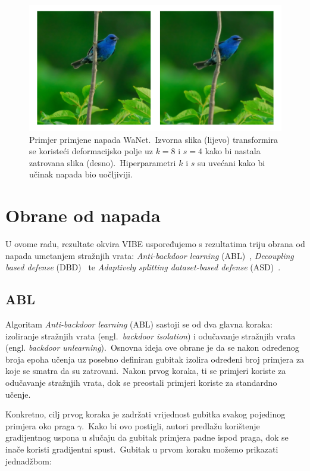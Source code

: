\documentclass[diplomskirad]{fer}
\begin{document}
\begin{figure}[h]
  \centering
  \includegraphics[scale=0.6]{./Slike/imagenet1k_uzorak_wanet.png}
  \caption{Primjer primjene napada WaNet.\ Izvorna slika (lijevo) transformira se koristeći deformacijsko polje uz $k = 8$ i $s = 4$ kako bi nastala zatrovana slika (desno).\ Hiperparametri $k$ i $s$ su uvećani kako bi učinak napada bio uočljiviji.}
  \label{fig:wanet}
\end{figure}

\section{Obrane od napada}
\label{sek:obrane}

U ovome radu, rezultate okvira VIBE uspoređujemo s rezultatima triju obrana od napada umetanjem stražnjih vrata: \textit{Anti-backdoor learning} (ABL)~\cite{li2021anti}, \textit{Decoupling based defense} (DBD)~\cite{huang2022backdoor} te \textit{Adaptively splitting dataset-based defense} (ASD)~\cite{gao2023backdoor}.\

\subsection{ABL}
\label{sub:abl}

Algoritam \textit{Anti-backdoor learning} (ABL) sastoji se od dva glavna koraka: izoliranje stražnjih vrata (engl.\ \textit{backdoor isolation}) i odučavanje stražnjih vrata (engl. \textit{backdoor unlearning}).\ 
Osnovna ideja ove obrane je da se nakon određenog broja epoha učenja uz posebno definiran gubitak izolira određeni broj primjera za koje se smatra da su zatrovani.\  
Nakon prvog koraka, ti se primjeri koriste za odučavanje stražnjih vrata, dok se preostali primjeri koriste za standardno učenje.\ 
  
Konkretno, cilj prvog koraka je zadržati vrijednost gubitka svakog pojedinog primjera oko praga $\gamma$.\
Kako bi ovo postigli, autori predlažu korištenje gradijentnog uspona u slučaju da gubitak primjera padne ispod praga, dok se inače koristi gradijentni spust.\ Gubitak u prvom koraku možemo prikazati jednadžbom:
\end{document}

